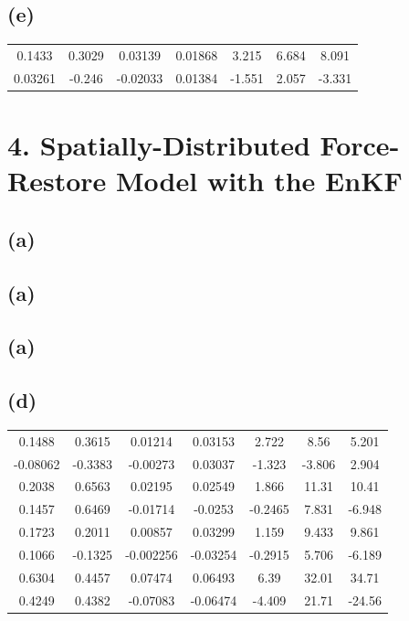 \documentclass[letterpaper]{tufte-handout}
\begin{document}
\subsection{(e)}
\begin{tabular}{ccccccc} 0.1433 & 0.3029 & 0.03139 & 0.01868 & 3.215 & 6.684 & 8.091\\ 0.03261 & -0.246 & -0.02033 & 0.01384 & -1.551 & 2.057 & -3.331 \end{tabular}
\section{4. Spatially-Distributed Force-Restore Model with the EnKF}
\subsection{(a)}
\subsection{(a)}
\subsection{(a)}
\subsection{(d)}
\begin{tabular}{ccccccc} 0.1488 & 0.3615 & 0.01214 & 0.03153 & 2.722 & 8.56 & 5.201\\ -0.08062 & -0.3383 & -0.00273 & 0.03037 & -1.323 & -3.806 & 2.904\\ 0.2038 & 0.6563 & 0.02195 & 0.02549 & 1.866 & 11.31 & 10.41\\ 0.1457 & 0.6469 & -0.01714 & -0.0253 & -0.2465 & 7.831 & -6.948\\ 0.1723 & 0.2011 & 0.00857 & 0.03299 & 1.159 & 9.433 & 9.861\\ 0.1066 & -0.1325 & -0.002256 & -0.03254 & -0.2915 & 5.706 & -6.189\\ 0.6304 & 0.4457 & 0.07474 & 0.06493 & 6.39 & 32.01 & 34.71\\ 0.4249 & 0.4382 & -0.07083 & -0.06474 & -4.409 & 21.71 & -24.56 \end{tabular}
\end{document}
